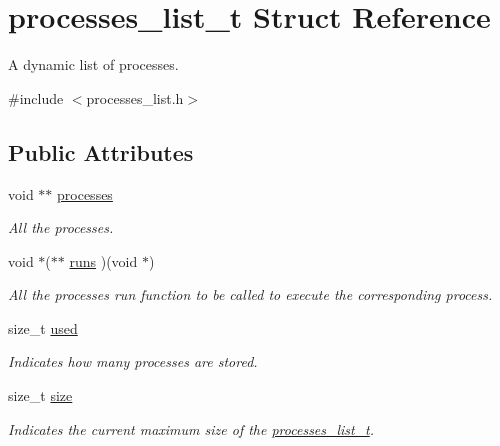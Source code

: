 \hypertarget{structprocesses__list__t}{\section{processes\-\_\-list\-\_\-t Struct Reference}
\label{structprocesses__list__t}
}


A dynamic list of processes.  




{\ttfamily \#include $<$processes\-\_\-list.\-h$>$}

\subsection*{Public Attributes}
\begin{DoxyCompactItemize}
\item 
\hypertarget{structprocesses__list__t_a9ea5ead7c55e29f6e2668f9b7265ac0b}{void $\ast$$\ast$ \hyperlink{structprocesses__list__t_a9ea5ead7c55e29f6e2668f9b7265ac0b}{processes}}\label{structprocesses__list__t_a9ea5ead7c55e29f6e2668f9b7265ac0b}

\begin{DoxyCompactList}\small\item\em All the processes. \end{DoxyCompactList}\item 
\hypertarget{structprocesses__list__t_aa1a799c82625a05d047cc7cb8b4476b0}{void $\ast$($\ast$$\ast$ \hyperlink{structprocesses__list__t_aa1a799c82625a05d047cc7cb8b4476b0}{runs} )(void $\ast$)}\label{structprocesses__list__t_aa1a799c82625a05d047cc7cb8b4476b0}

\begin{DoxyCompactList}\small\item\em All the processes run function to be called to execute the corresponding process. \end{DoxyCompactList}\item 
\hypertarget{structprocesses__list__t_abcbf5edb2d9b7570349dc704a518ed11}{size\-\_\-t \hyperlink{structprocesses__list__t_abcbf5edb2d9b7570349dc704a518ed11}{used}}\label{structprocesses__list__t_abcbf5edb2d9b7570349dc704a518ed11}

\begin{DoxyCompactList}\small\item\em Indicates how many processes are stored. \end{DoxyCompactList}\item 
\hypertarget{structprocesses__list__t_a5e908f7c57951717b13f0c243f188686}{size\-\_\-t \hyperlink{structprocesses__list__t_a5e908f7c57951717b13f0c243f188686}{size}}\label{structprocesses__list__t_a5e908f7c57951717b13f0c243f188686}

\begin{DoxyCompactList}\small\item\em Indicates the current maximum size of the \hyperlink{structprocesses__list__t}{processes\-\_\-list\-\_\-t}. \end{DoxyCompactList}\end{DoxyCompactItemize}


